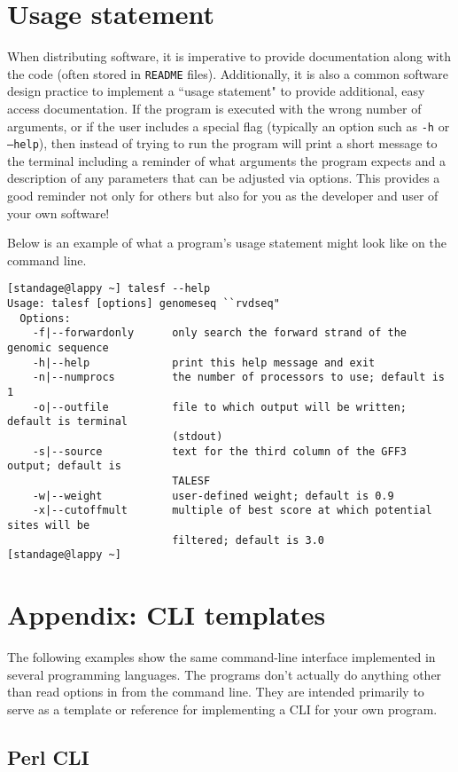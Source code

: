 \documentclass{article}
\begin{document}
\section{Usage statement}
When distributing software, it is imperative to provide documentation along with the code (often stored in \texttt{README} files). Additionally, it is also a common software design practice to implement a ``usage statement" to provide additional, easy access documentation. If the program is executed with the wrong number of arguments, or if the user includes a special flag (typically an option such as \texttt{-h} or \texttt{--help}), then instead of trying to run the program will print a short message to the terminal including a reminder of what arguments the program expects and a description of any parameters that can be adjusted via options. This provides a good reminder not only for others but also for you as the developer and user of your own software!

Below is an example of what a program's usage statement might look like on the command line.

\begin{verbatim}
[standage@lappy ~] talesf --help
Usage: talesf [options] genomeseq ``rvdseq"
  Options:
    -f|--forwardonly      only search the forward strand of the genomic sequence
    -h|--help             print this help message and exit
    -n|--numprocs         the number of processors to use; default is 1
    -o|--outfile          file to which output will be written; default is terminal
                          (stdout)
    -s|--source           text for the third column of the GFF3 output; default is
                          TALESF
    -w|--weight           user-defined weight; default is 0.9
    -x|--cutoffmult       multiple of best score at which potential sites will be
                          filtered; default is 3.0
[standage@lappy ~]
\end{verbatim}

\section{Appendix: CLI templates}
The following examples show the same command-line interface implemented in several programming languages. The programs don't actually do anything other than read options in from the command line. They are intended primarily to serve as a template or reference for implementing a CLI for your own program.

\subsection{Perl CLI}
\end{document}
